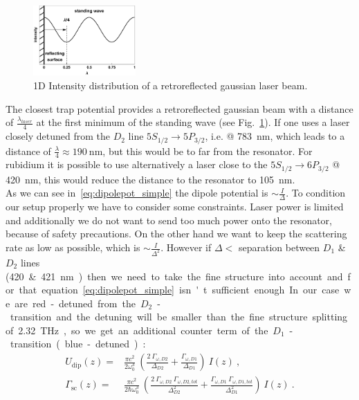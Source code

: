 \begin{figure}
    \centering
    \includegraphics[width=0.35\textwidth]{intensityplot}    
    \caption{\label{fig:intensityplot} 1D Intensity distribution of a retroreflected gaussian laser beam. }
\end{figure}
The closest trap potential provides a retroreflected gaussian beam with a distance
of \(\frac{\lambda_{laser}}{4} \) at the first minimum of the standing wave 
(see Fig.~\ref{fig:intensityplot}). If one
uses a laser closely detuned from the \(D_2 \) line \(5S_{1/2} \rightarrow 5P_{3/2} \), 
i.e. @ \SI{783}{\nano\meter}, which leads to a distance of 
\(\frac{\lambda}{4} \approx \SI{190}{\nano\meter} \), but this would be to far from
the resonator. For rubidium it is possible to 
use alternatively a laser close to the \(5S_{1/2} \rightarrow 6P_{3/2} \) @ \SI{420}{\nano\meter}, 
this would reduce the distance to the resonator to \SI{105}{\nano\meter}. \\
As we can see in~\eqref{eq:dipolepot_simple} the dipole potential is 
\(\sim \frac{I}{\Delta} \). To condition our setup properly we have to consider some
constraints. Laser power is limited and additionally we do not want to send too
much power onto the resonator, because of safety precautions. On the other hand we
want to keep the scattering rate as low as possible, which is \(\sim \frac{I}{\Delta^2} \).
However if \(\Delta < \) separation between \(D_1 \) \& \(D_2 \) lines (\SI{420} \& \SI{421}{\nano\meter}) then we need to take the fine 
structure into account and for that equation~\eqref{eq:dipolepot_simple} isn't sufficient enough. In our case we are 
red-detuned from the \(D_2 \)-transition and the detuning will be smaller than the fine 
structure splitting of \SI{2.32}{\tera\hertz}, so we get an additional counter term 
of the \(D_1 \)-transition (blue-detuned):
%
\begin{align}
    U_\mathrm{dip}(z) =& \frac{\pi c^2}{2\omega_0^3}~\left( 
        \frac{2~\Gamma_{\omega,D2}}{\Delta_{D2}} + 
        \frac{\Gamma_{\omega,D1}}{\Delta_{D1}} \right)~I(z)~, \\
    \Gamma_{\mathrm{sc}}(z) =& \frac{\pi c^2}{2\hbar\omega_0^3}~\left( 
        \frac{2~\Gamma_{\omega,D2}~\Gamma_{\omega,D2,tot} }{\Delta_{D2}^2 } + 
        \frac{\Gamma_{\omega,D1}~\Gamma_{\omega,D1,tot} }{\Delta_{D1}^2 } \right)~I(z)~.
\end{align}
